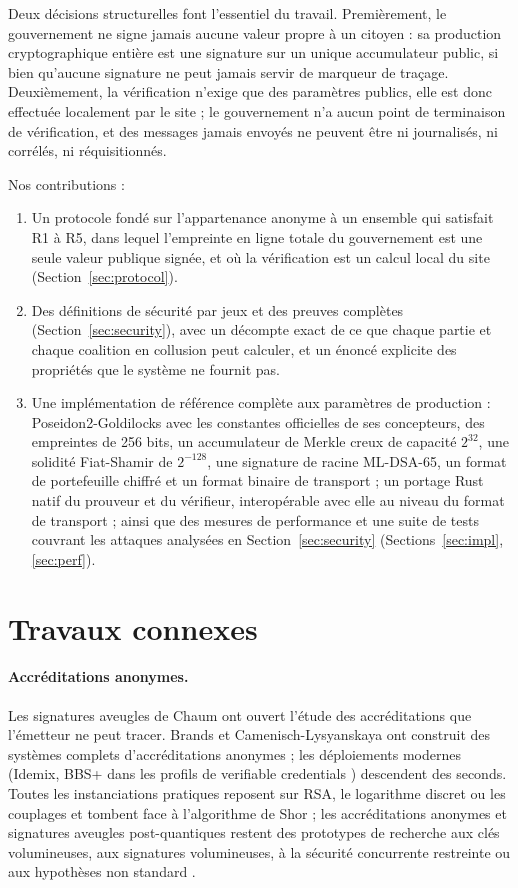\documentclass[11pt]{article}
\theoremstyle{definition}
\begin{document}
Deux décisions structurelles font l'essentiel du travail. Premièrement, le gouvernement ne
signe jamais aucune valeur propre à un citoyen : sa production cryptographique entière est
une signature sur un unique accumulateur public, si bien qu'aucune signature ne peut
jamais servir de marqueur de traçage. Deuxièmement, la vérification n'exige que des
paramètres publics, elle est donc effectuée localement par le site ; le gouvernement n'a
aucun point de terminaison de vérification, et des messages jamais envoyés ne peuvent être
ni journalisés, ni corrélés, ni réquisitionnés.

Nos contributions :
\begin{enumerate}[leftmargin=2em]
\item Un protocole fondé sur l'appartenance anonyme à un ensemble qui satisfait R1 à R5,
dans lequel l'empreinte en ligne totale du gouvernement est une seule valeur publique
signée, et où la vérification est un calcul local du site (Section~\ref{sec:protocol}).
\item Des définitions de sécurité par jeux et des preuves complètes
(Section~\ref{sec:security}), avec un décompte exact de ce que chaque partie et chaque
coalition en collusion peut calculer, et un énoncé explicite des propriétés que le système
ne fournit pas.
\item Une implémentation de référence complète aux paramètres de production :
Poseidon2-Goldilocks avec les constantes officielles de ses concepteurs, des empreintes de
256 bits, un accumulateur de Merkle creux de capacité $2^{32}$, une solidité Fiat-Shamir
de $2^{-128}$, une signature de racine ML-DSA-65, un format de portefeuille chiffré et un
format binaire de transport ; un portage Rust natif du prouveur et du vérifieur,
interopérable avec elle au niveau du format de transport ; ainsi que des mesures de
performance et une suite de tests
couvrant les attaques analysées en Section~\ref{sec:security} (Sections~\ref{sec:impl},
\ref{sec:perf}).
\end{enumerate}

\section{Travaux connexes}

\paragraph{Accréditations anonymes.} Les signatures aveugles de Chaum \cite{chaum} ont
ouvert l'étude des accréditations que l'émetteur ne peut tracer. Brands \cite{brands} et
Camenisch-Lysyanskaya \cite{cl} ont construit des systèmes complets d'accréditations
anonymes ; les déploiements modernes (Idemix, BBS+ dans les profils de verifiable
credentials \cite{w3cvc}) descendent des seconds. Toutes les instanciations pratiques
reposent sur RSA, le logarithme discret ou les couplages et tombent face à l'algorithme de
Shor \cite{shor} ; les accréditations anonymes et signatures aveugles post-quantiques
restent des prototypes de recherche aux clés volumineuses, aux signatures volumineuses, à
la sécurité concurrente restreinte ou aux hypothèses non standard \cite{aksy,delpino}.
\end{document}
